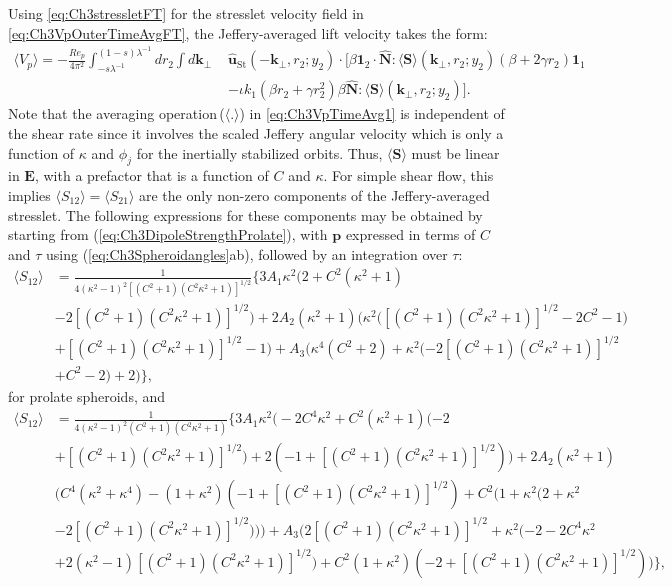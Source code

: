 \documentclass{jfm}
\begin{document}
Using \eqref{eq:Ch3stressletFT} for the stresslet velocity field in \eqref{eq:Ch3VpOuterTimeAvgFT}, the Jeffery-averaged lift velocity takes the form:
\begin{align}
\langle V_p\rangle =-\frac{Re_p}{4\pi^2}\int_{-s\lambda^{-1}}^{(1-s)\lambda^{-1}} dr_2\int d\bm{k}_\perp\,\, &\hat{\bm{u}}_\text{St}(-\bm{k}_\perp,r_2;y_2)\cdot
\big[\beta\bm{1}_2\cdot\hat{\bm{N}}:\langle\bm{S}\rangle(\bm{k}_\perp,r_2;y_2)(\beta+2\gamma r_2)\bm{1}_1\nonumber\\
&-\iota k_1(\beta r_2 +\gamma r_2^2) \beta\hat{\bm{N}}:\langle\bm{S}\rangle(\bm{k}_\perp,r_2;y_2)\big]. \label{eq:Ch3VpTimeAvg1}
\end{align}
Note that the averaging operation\,($\langle.\rangle$) in \eqref{eq:Ch3VpTimeAvg1} is independent of the shear rate since it involves the scaled Jeffery angular velocity which is only a function of $\kappa$ and $\phi_j$ for the inertially stabilized orbits. Thus, $\langle \bm{S}\rangle$ must be linear in $\bm{E}$, with a prefactor that is a function of $C$ and $\kappa$. For simple shear flow, this implies $\langle S_{12}\rangle=\langle S_{21}\rangle$ are the only non-zero components of the Jeffery-averaged stresslet. The following expressions for these components may be obtained by starting from (\ref{eq:Ch3DipoleStrengthProlate}), with $\bm{p}$ expressed in terms of $C$ and $\tau$ using (\ref{eq:Ch3Spheroidangles}ab), followed by an integration over $\tau$:
\begin{align}
\langle S_{12}\rangle&=\frac{1}{4(\kappa^2-1)^2[(C^2+1)(C^2\kappa^2+1)]^{1/2}}\Bigg\{3 A_1 \kappa^2\bigg(2+C^2(\kappa^2+1)\nonumber\\
&-2 [(C^2+1) (C^2 \kappa^2+1)]^{1/2}\bigg)+2 A_2(\kappa^2+1)\bigg(\kappa^2 \Big([(C^2+1) (C^2 \kappa^2+1)]^{1/2}-2 C^2-1\Big)\nonumber\\
&+[(C^2+1) (C^2 \kappa^2+1)]^{1/2}-1\bigg)+A_3 \bigg(\kappa^4(C^2+2)+\kappa^2 (-2 [(C^2+1) (C^2 \kappa^2+1)]^{1/2}\nonumber\\
&+C^2-2)+2\bigg)\Bigg\}, \label{eq:Ch3TimeAvgDipoleStrength}
\end{align}
for prolate spheroids, and
\begin{align}
\langle S_{12}\rangle &= \frac{1}{4(\kappa^2-1)^2(C^2+1)(C^2\kappa^2+1)}\Bigg\{3 A_1 \kappa^2\bigg(-2C^4\kappa^2 +C^2(\kappa^2+1)(-2\nonumber\\
&+[(C^2+1)(C^2\kappa^2+1)]^{1/2})+2 (-1+[(C^2+1)(C^2\kappa^2+1)]^{1/2})\bigg)+2 A_2(\kappa^2+1)\nonumber\\
&\bigg(C^4 (\kappa^2+\kappa^4)-(1+\kappa^2)(-1+[(C^2+1)(C^2\kappa^2+1)]^{1/2})+C^2(1+\kappa^2(2+\kappa^2\nonumber\\
&-2[(C^2+1)(C^2\kappa^2+1)]^{1/2}))\bigg)+A_3 \bigg(2[(C^2+1)(C^2\kappa^2+1)]^{1/2}+\kappa^2(-2-2C^4\kappa^2\nonumber\\
&+2(\kappa^2-1)[(C^2+1)(C^2\kappa^2+1)]^{1/2})+C^2(1+\kappa^2)(-2+[(C^2+1)(C^2\kappa^2+1)]^{1/2})\bigg)\Bigg\},\label{eq:Ch3TimeAvgDipoleStrength2}
\end{align}
\end{document}

